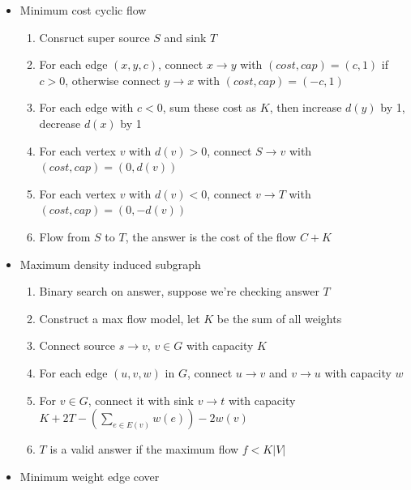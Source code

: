 \begin{itemize}
    \begin{enumerate}

        \item Redirect every edge: $y \rightarrow x$ if $(x, y) \in M$, $x \rightarrow y$ otherwise.
        \item DFS from unmatched vertices in $X$.
        \item $x \in X$ is chosen iff $x$ is unvisited.
        \item $y \in Y$ is chosen iff $y$ is visited.
    \end{enumerate}
    \item Minimum cost cyclic flow

    \begin{enumerate}

        \item Consruct super source $S$ and sink $T$
        \item For each edge $(x, y, c)$, connect $x \rightarrow y$ with $(cost, cap) = (c, 1)$ if $c > 0$, otherwise connect $y \rightarrow x$ with $(cost, cap) = (-c, 1)$
        \item For each edge with $c < 0$, sum these cost as $K$, then increase $d(y)$ by 1, decrease $d(x)$ by 1
        \item For each vertex $v$ with $d(v) > 0$, connect $S \rightarrow v$ with $(cost, cap) = (0, d(v))$
        \item For each vertex $v$ with $d(v) < 0$, connect $v \rightarrow T$ with $(cost, cap) = (0, -d(v))$
        \item Flow from $S$ to $T$, the answer is the cost of the flow $C + K$
    \end{enumerate}
    \item Maximum density induced subgraph

    \begin{enumerate}

        \item Binary search on answer, suppose we're checking answer $T$
        \item Construct a max flow model, let $K$ be the sum of all weights
        \item Connect source $s \rightarrow v$, $v \in G$ with capacity $K$
        \item For each edge $(u, v, w)$ in $G$, connect $u \rightarrow v$ and $v \rightarrow u$ with capacity $w$
        \item For $v \in G$, connect it with sink $v \rightarrow t$ with capacity $K + 2T - (\sum_{e \in E(v)}{w(e)}) - 2w(v)$
        \item $T$ is a valid answer if the maximum flow $f < K \lvert V \rvert$
    \end{enumerate}
    \item Minimum weight edge cover


\end{itemize}
